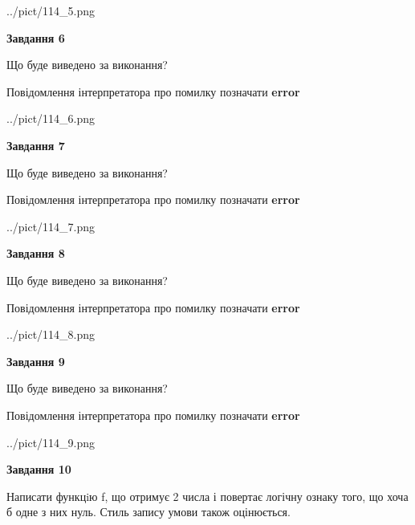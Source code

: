 \documentclass[12pt, ukrainian]{article}
\begin{document}
{\begin {large}
\begin{center}
	{../pict/114_5.png}
\end{center}
\newpage

{\begin {center}\textbf{Завдання 6}\end {center}}\par
Що буде виведено за виконання? \par
Повідомлення інтерпретатора про помилку позначати \textbf{error}

\begin{center}
	{../pict/114_6.png}
\end{center}
\newpage

{\begin {center}\textbf{Завдання 7}\end {center}}\par
Що буде виведено за виконання? \par
Повідомлення інтерпретатора про помилку позначати \textbf{error}

\begin{center}
	{../pict/114_7.png}
\end{center}
\newpage

{\begin {center}\textbf{Завдання 8}\end {center}}\par
Що буде виведено за виконання? \par
Повідомлення інтерпретатора про помилку позначати \textbf{error}

\begin{center}
	{../pict/114_8.png}
\end{center}
\newpage

{\begin {center}\textbf{Завдання 9}\end {center}}\par
Що буде виведено за виконання? \par
Повідомлення інтерпретатора про помилку позначати \textbf{error}

\begin{center}
	{../pict/114_9.png}
\end{center}
\newpage

{\begin {center}\textbf{Завдання 10}\end {center}}\par

Написати функцiю f, що отримує 2 числа і повертає логічну ознаку того, що хоча б одне з них нуль. Стиль запису умови також оцінюється.\par
\newpage

\end {large}}
\end{document}
